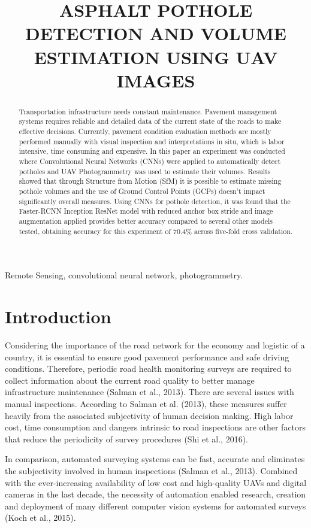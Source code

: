 \documentclass{article}
\title{ASPHALT POTHOLE DETECTION AND VOLUME ESTIMATION USING UAV IMAGES}
\begin{document}
%
\maketitle
%
\begin{abstract}
Transportation infrastructure needs constant maintenance. Pavement management systems requires reliable and detailed data of the current state of the roads to make effective decisions. Currently, pavement condition evaluation methods are mostly performed manually with visual inspection and interpretations in situ, which is labor intensive, time consuming and expensive. In this paper an experiment was conducted where Convolutional Neural Networks (CNNs) were applied to automatically detect potholes and UAV Photogrammetry was used to estimate their volumes. Results showed that through Structure from Motion (SfM) it is possible to estimate missing pothole volumes and the use of Ground Control Points (GCPs) doesn’t impact significantly overall measures. Using CNNs for pothole detection, it was found that the Faster-RCNN Inception ResNet model with reduced anchor box stride and image augmentation applied provides better accuracy compared to several other models tested, obtaining accuracy for this experiment of 70.4\% across five-fold cross validation.


\end{abstract}
%
\begin{keywords}
Remote Sensing, convolutional neural network, photogrammetry.
\end{keywords}
%
\section{Introduction}
\label{sec:intro}

Considering the importance of the road network for the economy and logistic of a country, it is essential to ensure good pavement performance and safe driving conditions. Therefore, periodic road health monitoring surveys are required to collect information about the current road quality to better manage infrastructure maintenance (Salman et al., 2013). There are several issues with manual inspections. According to Salman et al. (2013), these measures suffer heavily from the associated subjectivity of human decision making. High labor cost, time consumption and dangers intrinsic to road inspections are other factors that reduce the periodicity of survey procedures (Shi et al., 2016).

In comparison, automated surveying systems can be fast, accurate and eliminates the subjectivity involved in human inspections (Salman et al., 2013). Combined with the ever-increasing availability of low cost and high-quality UAVs and digital cameras in the last decade, the necessity of automation enabled research, creation and deployment of many different computer vision systems for automated surveys (Koch et al., 2015).
\end{document}
